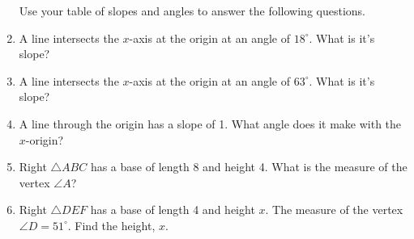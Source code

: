 \documentclass[12pt, twoside]{article}
\begin{document}
\begin{enumerate}
\newpage 
Use your table of slopes and angles to answer the following questions. 
  \item A line intersects the $x$-axis at the origin at an angle of $18^\circ$. What is it's slope? \vspace{1cm}
  \item A line intersects the $x$-axis at the origin at an angle of $63^\circ$. What is it's slope? \vspace{1cm}
  \item A line through the origin has a slope of 1. What angle does it make with the $x$-origin? \vspace{1cm}
  \item Right $\triangle ABC$ has a base of length 8 and height 4. What is the measure of the vertex $\angle A$?
    \begin{flushright}
    \end{flushright} 

    \item Right $\triangle DEF$ has a base of length 4 and height $x$. The measure of the vertex $\angle D = 51^\circ$. Find the height, $x$.
    \begin{flushright}
    \end{flushright}

\end{enumerate}
\end{document}
